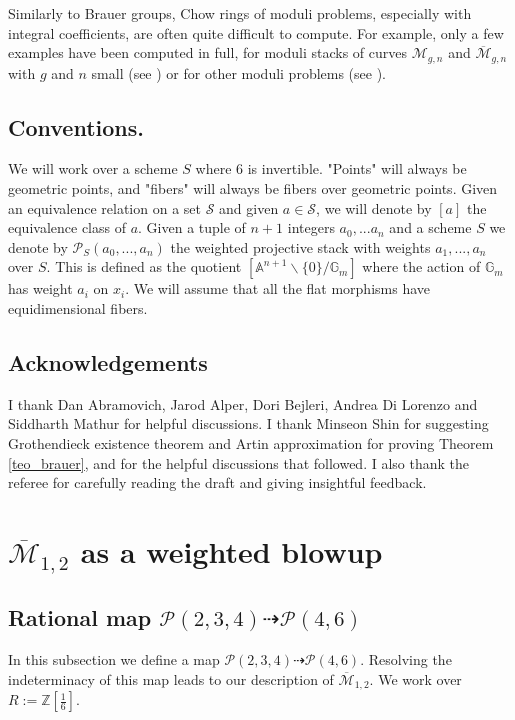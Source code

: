 \documentclass[11pt]{amsart}
\theoremstyle{definition}
\theoremstyle{remark}
\newcommand{\bA}{{\mathbb A}}
\newcommand{\calM}{\mathcal M}
\newcommand{\calP}{\mathcal P}
\newcommand{\sS}{\mathscr{S}}
\newcommand{\bG}{\mathbb{G}}
\begin{document}
Similarly to Brauer groups, Chow rings of moduli problems, especially with integral coefficients, are often quite difficult to compute. For example, only a few examples have been computed in full, for moduli stacks of curves $\calM_{g,n}$ and $\overline{\calM}_{g,n}$ with $g$ and $n$ small (see \cites{Vis, Lar, DLV, di2021stable}) or for other moduli problems
(see \cites{ EdFu, DL, DLFV, CDLI}).

\subsection{Conventions.} We will work over a scheme $S$ where 6 is invertible. "Points" will always be geometric points, and "fibers" will always be fibers over geometric points. Given an equivalence relation on a set $\sS$ and given $a\in \sS$, we will denote by $[a]$ the equivalence class of $a$.  Given a tuple of $n+1$ integers $a_0,...a_n$ and a scheme $S$ we denote by $\mathcal{P}_S (a_0,...,a_n)$ the weighted projective stack with weights $a_1,...,a_n$ over $S$. This is defined as the quotient $[\bA^{n+1}\smallsetminus \{0\}/\bG_m]$ where the action of $\bG_m$ has weight $a_i$ on $x_i$. We will assume that all the flat morphisms have equidimensional fibers. 

\subsection{Acknowledgements} I thank Dan Abramovich, Jarod Alper, Dori Bejleri, Andrea Di Lorenzo and Siddharth Mathur for helpful discussions. I thank Minseon Shin for suggesting Grothendieck existence theorem and Artin approximation for proving Theorem \ref{teo_brauer}, and for the helpful discussions that followed.  I also thank the referee
for carefully reading the draft and giving insightful feedback. 

\section{$\overline{\calM}_{1,2}$ as a weighted blowup}
\subsection{Rational map $\calP(2,3,4)\dashrightarrow \calP(4,6)$}\label{subsection_desc_of_the_space} In this subsection we define a map $\calP(2,3,4)\dashrightarrow \calP(4,6)$. Resolving the indeterminacy of this map leads to our description of $\overline{\calM}_{1,2}$. We work over $R:= \mathbb{Z}[\frac{1}{6}]$.
\end{document}
